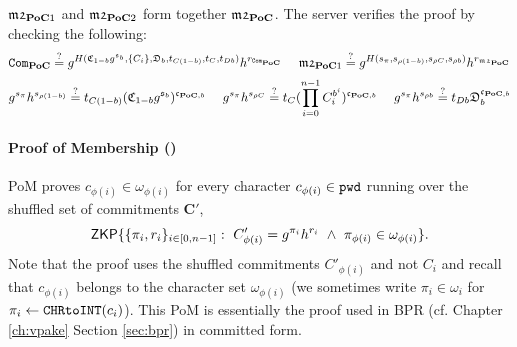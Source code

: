 \noindent
$\mathfrak{m2}_{\mathsf{\bf PoC}1}$ and $\mathfrak{m2}_{\mathsf{\bf PoC}2}$ form together $\mathfrak{m2}_{\mathsf{\bf PoC}}$.
The server verifies the proof by checking the following:
\[
  \mathtt{Com}_{\mathsf{\bf PoC}} \stackrel{?}{=} g^{H(\mathfrak{C}_{1-b}g^{\mathfrak{s}_b}, \{C_i\}, \mathfrak{D}_b, t_{C(1-b)}, t_C, t_{Db})} h^{r_{\mathtt{Com}_{\mathsf{\bf PoC}}}} ~~~~
  \mathfrak{m2}_{\mathsf{\bf PoC}1} \stackrel{?}{=} g^{H(s_{\pi}, s_{\rho (1-b)}, s_{\rho C}, s_{\rho b})} h^{r_{\mathfrak{m2}_{\mathsf{\bf PoC}}}}
\]
\[
  g^{s_{\pi}}h^{s_{\rho (1-b)}} \stackrel{?}{=} t_{C(1-b)}(\mathfrak{C}_{1-b}g^{\mathfrak{s}_b})^{\mathfrak{c}_{\mathsf{\bf PoC},b}} ~~~~
  g^{s_{\pi}}h^{s_{\rho C}} \stackrel{?}{=} t_{C}(\prod_{i=0}^{n-1} C_i^{b^i})^{\mathfrak{c}_{\mathsf{\bf PoC},b}} ~~~~
  g^{s_{\pi}}h^{s_{\rho b}} \stackrel{?}{=} t_{Db}\mathfrak{D}_{b}^{\mathfrak{c}_{\mathsf{\bf PoC},b}}
\]

\paragraph{Proof of Membership (\PoM)}
\ac{PoM} proves $c_{\phi(i)}\in\omega_{\phi(i)}$ for every character $c_{\phi(i)}\in\mathtt{pwd}$ running over the shuffled set of commitments $\bm C'$, \ie
\begin{equation*}
\mathsf{ZKP}\{\{\pi_i,r_i\}_{i\in[0,n-1]} : ~ C'_{\phi(i)}=g^{\pi_{i}}h^{r_{i}} ~ \wedge ~ \pi_{\phi(i)}\in \omega_{\phi(i)}\}.
\end{equation*}
Note that the proof uses the shuffled commitments $C'_{\phi(i)}$ and not $C_i$ and recall that $c_{\phi(i)}$ belongs to the character set $\omega_{\phi(i)}$ (we sometimes write $\pi_i\in\omega_i$ for $\pi_i\gets\texttt{CHRtoINT}(c_i)$).
This \ac{PoM} is essentially the proof used in \ac{BPR} (cf. Chapter \ref{ch:vpake} Section \ref{sec:bpr}) in committed form.

